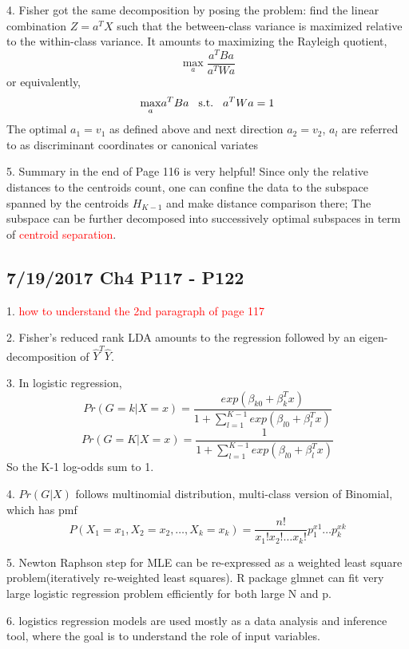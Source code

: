 \documentclass[a4paper, 12pt]{article}
\begin{document}
4. Fisher got the same decomposition by posing the problem: find the linear combination $Z=a^TX$ such that the between-class variance is maximized relative to the within-class variance. It amounts to maximizing the Rayleigh quotient,
\[ \displaystyle{\max_{a}}\frac{a^TBa}{a^TWa}
\]
or equivalently, 
\[ \displaystyle{\max_{a}}a^TBa \hspace{3mm}\text{s.t.} \hspace{3mm} a^TWa=1
\]
The optimal $a_1=v_1$ as defined above and next direction $a_2=v_2$, $a_l$ are referred to as discriminant coordinates or canonical variates

5. Summary in the end of Page 116 is very helpful! Since only the relative distances to the centroids count, one can confine the data to the subspace spanned by the centroids $H_{K-1}$ and make distance comparison there; The subspace can be further decomposed into successively optimal subspaces in term of \textcolor{red}{centroid separation}.


\subsection*{7/19/2017 Ch4 P117 - P122 }

1. \textcolor{red}{how to understand the 2nd paragraph of page 117}

2. Fisher's reduced rank LDA amounts to the regression followed by an eigen-decomposition of $\hat{Y}^T\hat{Y}$.

3. In logistic regression,
$$Pr(G=k|X=x)=\frac{exp(\beta_{k0}+\beta_k^Tx)}{1+\sum_{l=1}^{K-1}exp(\beta_{l0}+\beta_l^Tx)}$$
$$Pr(G=K|X=x)=\frac{1}{1+\sum_{l=1}^{K-1}exp(\beta_{l0}+\beta_l^Tx)}$$
So the K-1 log-odds sum to 1.

4. $Pr(G|X)$ follows multinomial distribution, multi-class version of Binomial,  which has pmf $$P(X_1=x_1,X_2=x_2,\ldots,X_k=x_k)=\frac{n!}{x_1!x_2!\ldots x_k!}p_1^{x1}\ldots p_k^{xk}$$

5. Newton Raphson step for MLE can be re-expressed as a weighted least square problem(iteratively re-weighted least squares). R package glmnet can fit very large logistic regression problem efficiently for both large N and p.

6. logistics regression models are used mostly as a data analysis and inference tool, where the goal is to understand the role of input variables.
\end{document}
